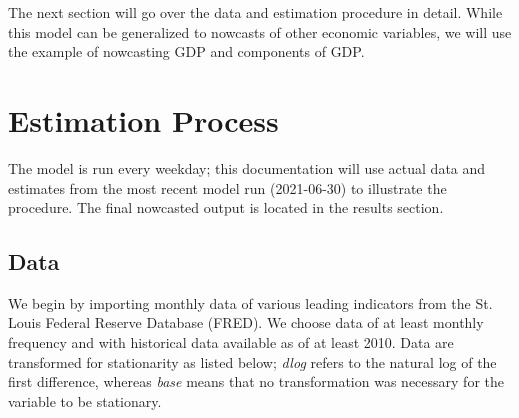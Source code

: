 \documentclass[11pt, letterpaper]{article}\usepackage[]{graphicx}\usepackage[]{color}
\begin{document}
The next section will go over the data and estimation procedure in detail. While this model can be generalized to nowcasts of other economic variables, we will use the example of nowcasting GDP and components of GDP.

\newpage
\section{Estimation Process}
The model is run every weekday; this documentation will use actual data and estimates from the most recent model run (2021-06-30) to illustrate the procedure. The final nowcasted output is located in the results section.

\subsection{Data}
We begin by importing monthly data of various leading indicators from the St. Louis Federal Reserve Database (FRED). We choose data of at least monthly frequency and with historical data available as of at least 2010. Data are transformed for stationarity as listed below; \textit{dlog} refers to the natural log of the first difference, whereas \textit{base} means that no transformation was necessary for the variable to be stationary.
\end{document}
